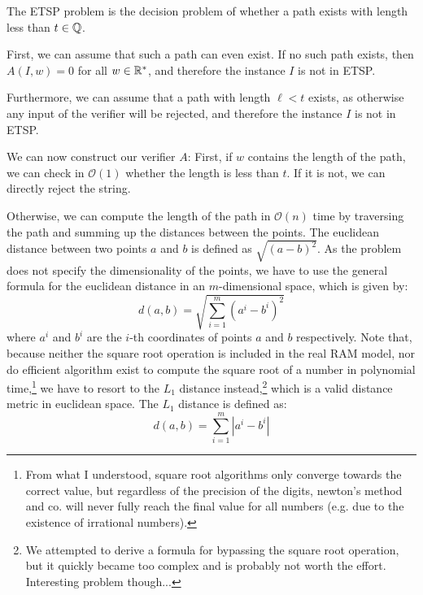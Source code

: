 \documentclass{article}
\begin{document}
The ETSP problem is the decision problem of whether a path exists with length less than $t\in \mathbb{Q}$.

First, we can assume that such a path can even exist. If no such path exists, then $A(I, w) = 0$ for all $w\in \mathbb{R}^*$, and therefore the instance $I$ is not in ETSP.

Furthermore, we can assume that a path with length $\ell < t$ exists, as otherwise any input of the verifier will be rejected, and therefore the instance $I$ is not in ETSP.

We can now construct our verifier $A$: 
First, if $w$ contains the length of the path, we can check in $\mathcal{O}(1)$ whether the length is less than $t$. If it is not, we can directly reject the string.

Otherwise, we can compute the length of the path in $\mathcal{O}(n)$ time by traversing the path and summing up the distances between the points. 
The euclidean distance between two points $a$ and $b$ is defined as $\sqrt{(a - b)^2}$.
As the problem does not specify the dimensionality of the points, we have to use the general formula for the euclidean distance in an $m$-dimensional space, which is given by: 
\begin{equation*}
    d(a, b) = \sqrt{\sum_{i=1}^m (a^i - b^i)^2}
\end{equation*}
where $a^i$ and $b^i$ are the $i$-th coordinates of points $a$ and $b$ respectively.
Note that, because neither the square root operation is included in the real RAM model, nor do efficient algorithm exist to compute the square root of a number in polynomial time,\!\footnote{From what I understood, square root algorithms only converge towards the correct value, but regardless of the precision of the digits, newton's method and co. will never fully reach the final value for all numbers (e.g. due to the existence of irrational numbers).} we have to resort to the $L_1$ distance instead,\!\footnote{We attempted to derive a formula for bypassing the square root operation, but it quickly became too complex and is probably not worth the effort. Interesting problem though...} which is a valid distance metric in euclidean space. The $L_1$ distance is defined as:
\begin{equation*}
    d(a, b) = \sum_{i=1}^m |a^i - b^i|
\end{equation*}
\end{document}
